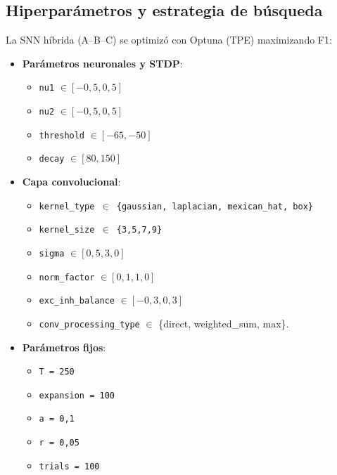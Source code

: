 

\subsection{Hiperparámetros y estrategia de búsqueda}
La SNN híbrida (A--B--C) se optimizó con Optuna (TPE) maximizando F1:
\begin{itemize}
    \item \textbf{Parámetros neuronales y STDP}:
    \begin{itemize}
        \item \texttt{nu1} \(\in [-0{,}5, 0{,}5]\)
        \item \texttt{nu2} \(\in [-0{,}5, 0{,}5]\)
        \item \texttt{threshold} \(\in [-65, -50]\)
        \item \texttt{decay} \(\in [80, 150]\)
    \end{itemize}
    \item \textbf{Capa convolucional}:
    \begin{itemize}
        \item \texttt{kernel\_type \(\in\) \{gaussian, laplacian, mexican\_hat, box\}}
        \item \texttt{kernel\_size \(\in\) \{3,5,7,9\}}
        \item \texttt{sigma} \(\in [0{,}5, 3{,}0]\)
        \item \texttt{norm\_factor} \(\in [0{,}1, 1{,}0]\)
        \item \texttt{exc\_inh\_balance} \(\in [-0{,}3, 0{,}3]\)
        \item \texttt{conv\_processing\_type} \(\in\) \{direct, weighted\_sum, max\}.
    \end{itemize}
    \item \textbf{Parámetros fijos}: 
     \begin{itemize}
        \item  \texttt{T = 250}
        \item \texttt{expansion = 100}
        \item \texttt{a = 0{,}1}
        \item \texttt{r = 0{,}05}
        \item \texttt{trials = 100}
    \end{itemize}
\end{itemize}
